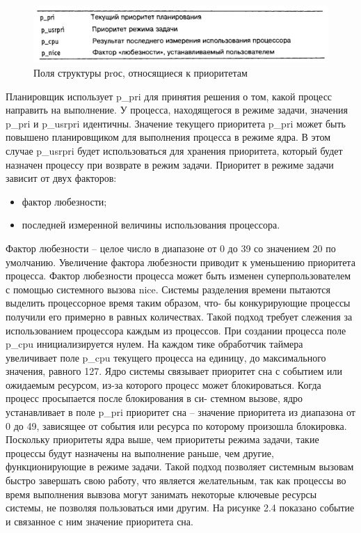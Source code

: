 \begin{figure}[H]
	\begin{center}
		\includegraphics[scale=0.6]{assets/pr.png}
	\end{center}
	\caption{Поля структуры рrос, относящиеся к приоритетам}
\end{figure}

Планировщик использует p\_pri для принятия решения о том, какой процесс направить на
выполнение. У процесса, находящегося в режиме задачи, значения p\_pri и p\_usrpri идентичны. Значение текущего приоритета p\_pri может быть повышено планировщиком для выполнения процесса в режиме ядра. В этом случае p\_usrpri будет использоваться для хранения приоритета, который будет назначен процессу при возврате в режим задачи. Приоритет в
режиме задачи зависит от двух факторов:
\begin{itemize}
	\item фактор любезности;
	\item последней измеренной величины использования процессора.
\end{itemize}

Фактор любезности – целое число в диапазоне от 0 до 39 со значением 20 по умолчанию.
Увеличение фактора любезности приводит к уменьшению приоритета процесса. Фактор любезности процесса может быть изменен суперпользователем с помощью системного вызова
nice.
Системы разделения времени пытаются выделить процессорное время таким образом, что-
бы конкурирующие процессы получили его примерно в равных количествах. Такой подход
требует слежения за использованием процессора каждым из процессов. При создании процесса поле p\_cpu инициализируется нулем. На каждом тике обработчик таймера увеличивает
поле p\_cpu текущего процесса на единицу, до максимального значения, равного 127.
Ядро системы связывает приоритет сна с событием или ожидаемым ресурсом, из-за которого процесс может блокироваться. Когда процесс просыпается после блокирования в си-
стемном вызове, ядро устанавливает в поле p\_pri приоритет сна – значение приоритета из
диапазона от 0 до 49, зависящее от события или ресурса по которому произошла блокировка.
Поскольку приоритеты ядра выше, чем приоритеты режима задачи, такие процессы будут
назначены на выполнение раньше, чем другие, функционирующие в режиме задачи. Такой
подход позволяет системным вызовам быстро завершать свою работу, что является желательным, так как процессы во время выполнения вывзова могут занимать некоторые ключевые
ресурсы системы, не позволяя пользоваться ими другим. На рисунке 2.4 показано событие и
связанное с ним значение приоритета сна.

